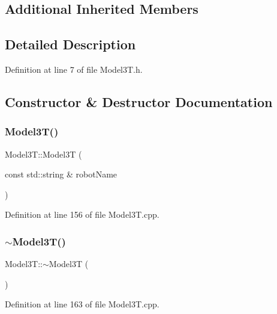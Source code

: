 \subsection*{Additional Inherited Members}


\subsection{Detailed Description}


Definition at line 7 of file Model3\+T.\+h.



\subsection{Constructor \& Destructor Documentation}
\hypertarget{classModel3T_afbcee4d1130a7020034027aafd9eecf6}{}\label{classModel3T_afbcee4d1130a7020034027aafd9eecf6} 
\subsubsection{\texorpdfstring{Model3\+T()}{Model3T()}}
{\footnotesize\ttfamily Model3\+T\+::\+Model3T (\begin{DoxyParamCaption}\item[{const std\+::string \&}]{robot\+Name }\end{DoxyParamCaption})}



Definition at line 156 of file Model3\+T.\+cpp.

\hypertarget{classModel3T_a6dedc34c9fefff7bd94d7c482eab04d1}{}\label{classModel3T_a6dedc34c9fefff7bd94d7c482eab04d1} 
\subsubsection{\texorpdfstring{$\sim$\+Model3\+T()}{~Model3T()}}
{\footnotesize\ttfamily Model3\+T\+::$\sim$\+Model3T (\begin{DoxyParamCaption}{ }\end{DoxyParamCaption})\hspace{0.3cm}{\ttfamily [virtual]}}



Definition at line 163 of file Model3\+T.\+cpp.



